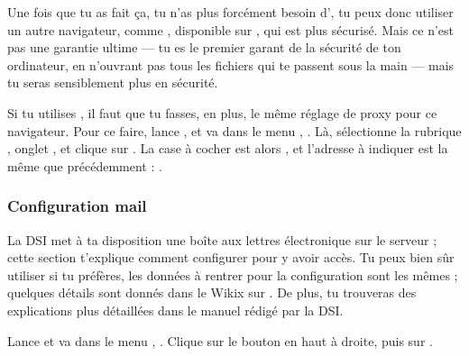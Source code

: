 Une fois que tu as fait \c{c}a, tu n'as plus forc\'ement besoin d', tu peux donc utiliser un autre navigateur, comme , disponible sur \xshare, qui est plus s\'ecuris\'e. Mais ce n'est pas une garantie ultime --- tu es le premier garant de la s\'ecurit\'e de ton
ordinateur, en n'ouvrant pas tous les fichiers qui te passent sous la main
--- mais tu seras sensiblement plus en s\'ecurit\'e.

Si tu utilises , il faut que tu fasses, en plus, le m\^eme r\'eglage de proxy pour
ce navigateur. Pour ce faire, lance , et va dans le menu ,
. L\`a, s\'electionne la rubrique , onglet , et clique sur
. La case \`a cocher est alors ,
et l'adresse \`a indiquer est la m\^eme que pr\'ec\'edemment : .



\subsubsection{Configuration mail}

La DSI met \`a ta disposition une bo\^{i}te aux lettres \'electronique sur
le serveur  ; cette section t'explique comment
configurer  pour y avoir acc\`es. Tu peux bien
s\^{u}r utiliser  si tu pr\'ef\`eres, les donn\'ees \`a rentrer
pour la configuration sont les m\^emes ; quelques d\'etails sont donn\'es
dans le Wikix sur \fkz. De plus, tu trouveras des explications plus
d\'etaill\'ees dans le manuel r\'edig\'e par la DSI.

Lance  et va dans le menu ,
. Clique sur le bouton  en
haut \`a droite, puis sur .

